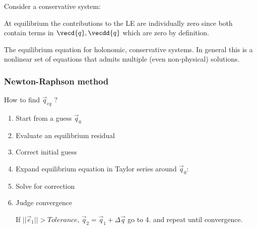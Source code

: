 \documentclass[10pt,a4paper]{scrartcl}
\begin{document}
\begin{multicols*}{2}
Consider a conservative system:


At equilibrium the contributions to the LE are individually zero since both contain terms in $\vecd{q},\vecdd{q}$ which are zero by definition.



The equilibrium equation for holonomic, conservative systems. In general this is a nonlinear set of equations that admits multiple (even non-physical) solutions.

\subsubsection{Newton-Raphson method}

How to find $\vec{q}_{eq}$ ?


\begin{enumerate}
\item Start from a guess $\vec{q}_0$
\item Evaluate an equilibrium residual

\item Correct initial guess

\item Expand equilibrium equation in Taylor series around $\vec{q}_0$:

\item Solve for correction


\item Judge convergence


If $||\vec{e}_1||>Tolerance$, $\vec{q}_2=\vec{q}_1+\Delta\vec{q}$ go to 4. and repeat until convergence.
\end{enumerate}


\end{multicols*}
\end{document}
